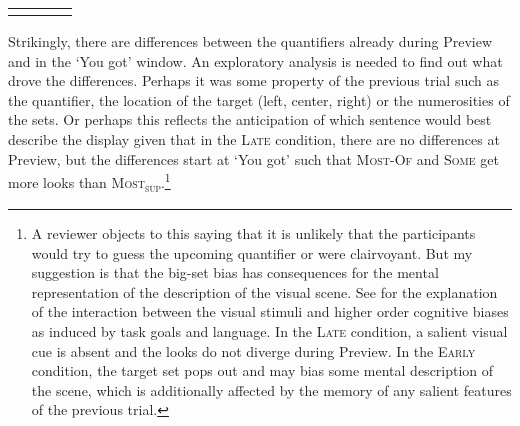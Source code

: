 \documentclass[output=paper]{langscibook}
\begin{document}
\begin{table}
\begin{tabularx}{\textwidth}{X@{}X@{}X@{}X}
  \lspbottomrule
 \end{tabularx}
\end{table}

Strikingly, there are differences between the quantifiers already during Preview and in the `You got' window. An
exploratory analysis is needed to find out what drove the differences. Perhaps it was some property of the previous
trial such as the quantifier, the location of the target (left, center, right) or the numerosities of the sets. Or perhaps
this reflects the anticipation of which sentence would best describe the display given that in the \textsc{Late} condition,
there are no differences at Preview, but the differences start at `You got' such that \textsc{Most-Of} and
\textsc{Some} get more looks than \textsc{Most\textsubscript{sup}}.\footnote{ A reviewer
objects to this saying that it is unlikely that the participants would try to guess the upcoming quantifier or were
clairvoyant. But my suggestion is that the big-set bias has consequences for the mental representation of the
description of the visual scene. See \citet{huettig2011looking} for the explanation of the interaction between the visual
stimuli and higher order cognitive biases as induced by task goals and language. In the \textsc{Late} condition, a salient
visual cue is absent and the looks do not diverge during Preview. In the \textsc{Early} condition, the target set pops out and
may bias some mental description of the scene, which is additionally affected by the memory of any salient features of
the previous trial.}
\end{document}
